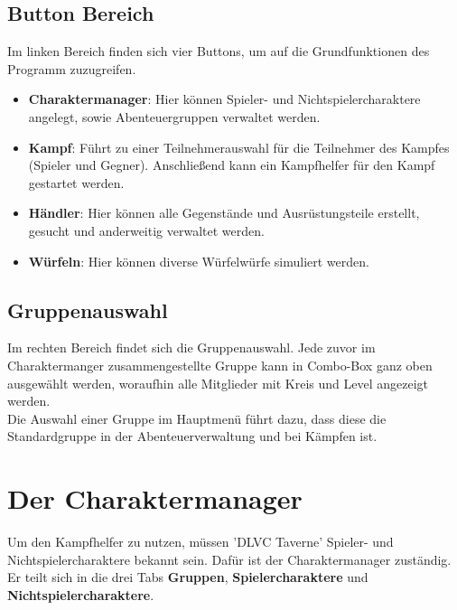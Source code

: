 \documentclass[11pt, a4paper, german]{article}
\begin{document}
\subsection{Button Bereich}
Im linken Bereich finden sich vier Buttons, um auf die Grundfunktionen des Programm zuzugreifen.
\begin{itemize}
	\item[] \textbf{Charaktermanager}: Hier können Spieler- und Nichtspielercharaktere angelegt, sowie Abenteuergruppen verwaltet werden.
	\item[] \textbf{Kampf}: Führt zu einer Teilnehmerauswahl für die Teilnehmer des Kampfes (Spieler und Gegner). Anschließend kann ein Kampfhelfer für den Kampf gestartet werden.
	\item[] \textbf{Händler}: Hier können alle Gegenstände und Ausrüstungsteile erstellt, gesucht und anderweitig verwaltet werden.
	\item[] \textbf{Würfeln}: Hier können diverse Würfelwürfe simuliert werden.
\end{itemize}

\subsection{Gruppenauswahl}\label{subsection:gruppenauswahl}
Im rechten Bereich findet sich die Gruppenauswahl. Jede zuvor im Charaktermanger zusammengestellte Gruppe kann in Combo-Box ganz oben ausgewählt werden, woraufhin alle Mitglieder mit Kreis und Level angezeigt werden.\\
Die Auswahl einer Gruppe im Hauptmenü führt dazu, dass diese die Standardgruppe in der Abenteuerverwaltung und bei Kämpfen ist.

\newpage

\section{Der Charaktermanager}
Um den Kampfhelfer zu nutzen, müssen 'DLVC Taverne' Spieler- und Nichtspielercharaktere bekannt sein. Dafür ist der Charaktermanager zuständig. Er teilt sich in die drei Tabs \textbf{Gruppen}, \textbf{Spielercharaktere} und \textbf{Nichtspielercharaktere}.
\end{document}
